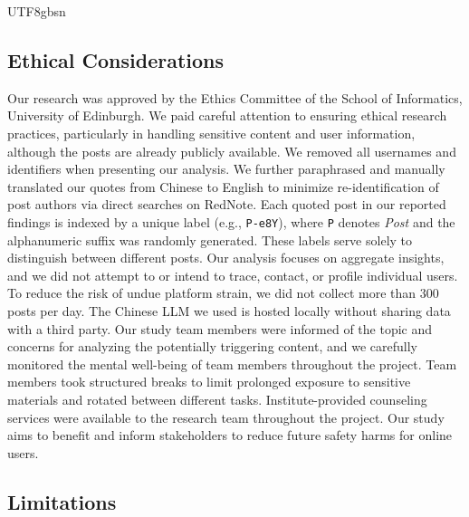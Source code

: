 \documentclass[sigconf,nonacm]{acmart}
\newcommand{\add}[1]{#1}
\begin{document}
\begin{CJK}{UTF8}{gbsn}
\subsection{Ethical Considerations}
\label{sec:ethics}
Our research was approved by the Ethics Committee of the School of Informatics, University of Edinburgh. We paid careful attention to ensuring ethical research practices, particularly in handling sensitive content and user information, although the posts are already publicly available. We removed all usernames and identifiers when presenting our analysis. We further paraphrased and manually translated our quotes from Chinese to English to minimize re-identification of post authors via direct searches on RedNote. 
\add{Each quoted post in our reported findings is indexed by a unique label (e.g., \texttt{P-e8Y}), where \texttt{P} denotes \emph{Post} and the alphanumeric suffix was randomly generated. These labels serve solely to distinguish between different posts.}
Our analysis focuses on aggregate insights, and we did not attempt to or intend to trace, contact, or profile individual users. To reduce the risk of undue platform strain, we did not collect more than 300 posts per day. The Chinese LLM we used is hosted locally without sharing data with a third party. Our study team members were informed of the topic and concerns for analyzing the potentially triggering content, and we carefully monitored the mental well-being of team members throughout the project. \add{Team members took structured breaks to limit prolonged exposure to sensitive materials and rotated between different tasks. Institute-provided counseling services were available to the research team throughout the project.} Our study aims to benefit and inform stakeholders to reduce future safety harms for online users.

\subsection{Limitations} 
\label{sec:limitation}


\end{CJK}
\end{document}

